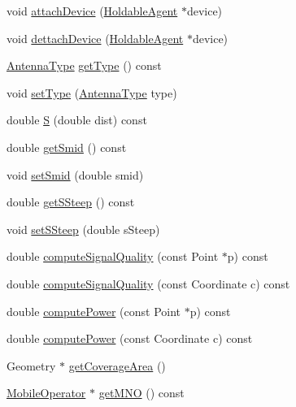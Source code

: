 \begin{DoxyCompactItemize}
\item 
void \mbox{\hyperlink{class_antenna_a9c804d991a545157feb066761b6a69ef}{attach\+Device}} (\mbox{\hyperlink{class_holdable_agent}{Holdable\+Agent}} $\ast$device)
\item 
void \mbox{\hyperlink{class_antenna_a983a0784315567c2ab6ac1820cf558c5}{dettach\+Device}} (\mbox{\hyperlink{class_holdable_agent}{Holdable\+Agent}} $\ast$device)
\item 
\mbox{\hyperlink{_antenna_type_8h_a7b678b5cb9dedc607131200119d96b16}{Antenna\+Type}} \mbox{\hyperlink{class_antenna_adf45a8b339956741bf8dcb5361f5f249}{get\+Type}} () const
\item 
void \mbox{\hyperlink{class_antenna_aa9a8414c469e6dd49eed7a7cc58725c1}{set\+Type}} (\mbox{\hyperlink{_antenna_type_8h_a7b678b5cb9dedc607131200119d96b16}{Antenna\+Type}} type)
\item 
double \mbox{\hyperlink{class_antenna_a5715c4100035c58d63b7c9a0195748fe}{S}} (double dist) const
\item 
double \mbox{\hyperlink{class_antenna_acfaf47d35cc742e76522ea31a8b01578}{get\+Smid}} () const
\item 
void \mbox{\hyperlink{class_antenna_a67e5ae0106189d18e4f114d8e0e14a09}{set\+Smid}} (double smid)
\item 
double \mbox{\hyperlink{class_antenna_a096deca0fe8497c0fe53539ae80f2db5}{get\+S\+Steep}} () const
\item 
void \mbox{\hyperlink{class_antenna_a92357bee36ba7dcfd08c4d2ce2280e3c}{set\+S\+Steep}} (double s\+Steep)
\item 
double \mbox{\hyperlink{class_antenna_afb03d417efec2423a1b67df16d6ebcb6}{compute\+Signal\+Quality}} (const Point $\ast$p) const
\item 
double \mbox{\hyperlink{class_antenna_ae49556bd6046b34a1dc1925d594783a2}{compute\+Signal\+Quality}} (const Coordinate c) const
\item 
double \mbox{\hyperlink{class_antenna_a7caa8004be14f97db64fdf7ae46d6c97}{compute\+Power}} (const Point $\ast$p) const
\item 
double \mbox{\hyperlink{class_antenna_a0192376f8702c5300fe1f13ce267b305}{compute\+Power}} (const Coordinate c) const
\item 
Geometry $\ast$ \mbox{\hyperlink{class_antenna_a5f94dd903add1b59957514887388bd52}{get\+Coverage\+Area}} ()
\item 
\mbox{\hyperlink{class_mobile_operator}{Mobile\+Operator}} $\ast$ \mbox{\hyperlink{class_antenna_abfbb4a654f73fe0c3a30f50777f79349}{get\+M\+NO}} () const

\end{DoxyCompactItemize}
